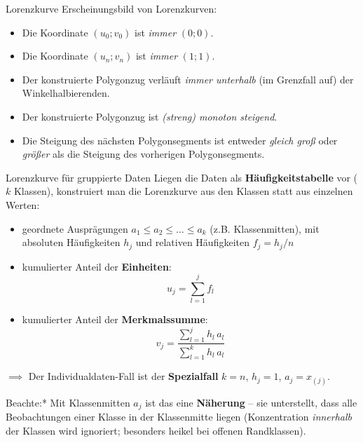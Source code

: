 \documentclass[
  10pt,
  ignorenonframetext,
]{beamer}
\providecommand{\tightlist}{%
  \setlength{\itemsep}{0pt}\setlength{\parskip}{0pt}}
\begin{document}
\begin{frame}{Lorenzkurve}
\protect\hypertarget{lorenzkurve-5}{}
Erscheinungsbild von Lorenzkurven:

\begin{itemize}
\tightlist
\item
  Die Koordinate \((u_{0}; v_{0})\) ist \textit{immer} \((0; 0)\).
\item
  Die Koordinate \((u_{n}; v_{n})\) ist \textit{immer} \((1; 1)\).
\item
  Der konstruierte Polygonzug verläuft \textit{immer unterhalb} (im
  Grenzfall auf) der Winkelhalbierenden.
\item
  Der konstruierte Polygonzug ist \textit{(streng) monoton steigend}.
\item
  Die Steigung des nächsten Polygonsegments ist entweder
  \textit{gleich groß} oder \textit{größer} als die Steigung des
  vorherigen Polygonsegments.
\end{itemize}
\end{frame}

\begin{frame}{Lorenzkurve für gruppierte Daten}
\protect\hypertarget{lorenzkurve-fuxfcr-gruppierte-daten}{}
Liegen die Daten als \textbf{Häufigkeitstabelle} vor (\(k\) Klassen),
konstruiert man die Lorenzkurve aus den Klassen statt aus einzelnen
Werten:

\begin{itemize}
\tightlist
\item
  geordnete Ausprägungen \(a_1 \leq a_2 \leq \ldots \leq a_k\) (z.B.
  Klassenmitten), mit absoluten Häufigkeiten \(h_j\) und relativen
  Häufigkeiten \(f_j = h_j/n\)
\item
  kumulierter Anteil der \textbf{Einheiten}:
  \[u_j = \sum_{l=1}^{j} f_l\]
\item
  kumulierter Anteil der \textbf{Merkmalssumme}:
  \[v_j = \frac{\sum_{l=1}^{j} h_l\, a_l}{\sum_{l=1}^{k} h_l\, a_l}\]
\end{itemize}

\(\implies\) Der Individualdaten-Fall ist der \textbf{Spezialfall}
\(k = n\), \(h_j = 1\), \(a_j = x_{(j)}\).

\scriptsize *Beachte:* Mit Klassenmitten \(a_j\) ist das eine
\textbf{Näherung} -- sie unterstellt, dass alle Beobachtungen einer
Klasse in der Klassenmitte liegen (Konzentration \emph{innerhalb} der
Klassen wird ignoriert; besonders heikel bei offenen Randklassen).
\end{frame}
\end{document}
